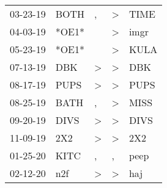 \begin{supertabular}{lllll}
 03-23-19 &   BOTH &                , &     \textgreater &   TIME \\
 04-03-19 &  *OE1* &                  &     \textgreater &   imgr \\
 05-23-19 &  *OE1* &                  &     \textgreater &   KULA \\
 07-13-19 &    DBK &     \textgreater &     \textgreater &    DBK \\
 08-17-19 &   PUPS &     \textgreater &     \textgreater &   PUPS \\
 08-25-19 &   BATH &                , &     \textgreater &   MISS \\
 09-20-19 &   DIVS &     \textgreater &     \textgreater &   DIVS \\
 11-09-19 &    2X2 &     \textgreater &     \textgreater &    2X2 \\
 01-25-20 &   KITC &                , &                , &   peep \\
 02-12-20 &    n2f &     \textgreater &     \textgreater &    haj \\
\end{supertabular}
